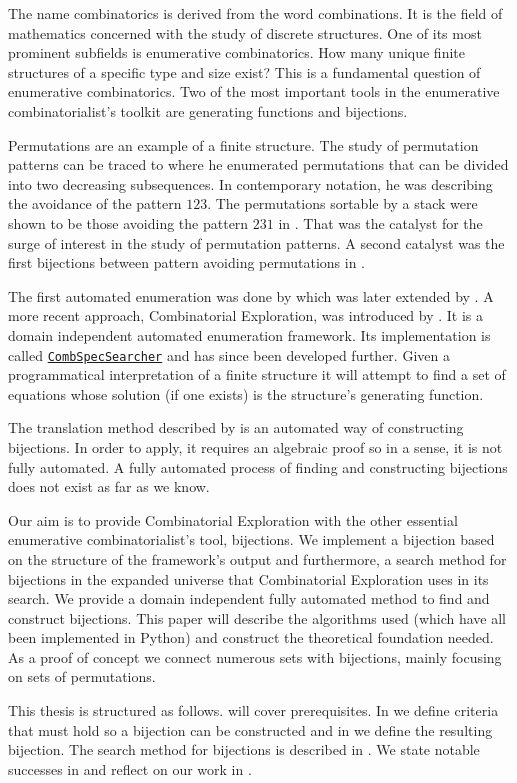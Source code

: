 \label{ch:introduction}
The name combinatorics is derived from the word combinations. It is the field of mathematics concerned with the study of discrete structures. One of its most prominent subfields is enumerative combinatorics. How many unique finite structures of a specific type and size exist? This is a fundamental question of enumerative combinatorics. Two of the most important tools in the enumerative combinatorialist's toolkit are generating functions and bijections.

Permutations are an example of a finite structure. The study of permutation patterns can be traced to  where he enumerated permutations that can be divided into two decreasing subsequences. In contemporary notation, he was describing the avoidance of the pattern $123$. The permutations sortable by a stack were shown to be those avoiding the pattern $231$ in . That was the catalyst for the surge of interest in the study of permutation patterns. A second catalyst was the first bijections between pattern avoiding permutations in . 

The first automated enumeration was done by  which was later extended by . A more recent approach, Combinatorial Exploration, was introduced by . It is a domain independent automated enumeration framework. Its implementation is called \href{https://github.com/PermutaTriangle/comb_spec_searcher}{\texttt{CombSpecSearcher}} and has since been developed further. Given a programmatical interpretation of a finite structure it will attempt to find a set of equations whose solution (if one exists) is the structure's generating function.

The translation method described by  is an automated way of constructing bijections. In order to apply, it requires an algebraic proof so in a sense, it is not fully automated. A fully automated process of finding and constructing bijections does not exist as far as we know.

Our aim is to provide Combinatorial Exploration with the other essential enumerative combinatorialist's tool, bijections. We implement a bijection based on the structure of the framework's output and furthermore, a search method for bijections in the expanded universe that Combinatorial Exploration uses in its search. We provide a domain independent fully automated method to find and construct bijections. This paper will describe the algorithms used (which have all been implemented in Python) and construct the theoretical foundation needed. As a proof of concept we connect numerous sets with bijections, mainly focusing on sets of permutations.

This thesis is structured as follows.  will cover prerequisites. In  we define criteria that must hold so a bijection can be constructed and in  we define the resulting bijection. The search method for bijections is described in . We state notable successes in  and reflect on our work in .
